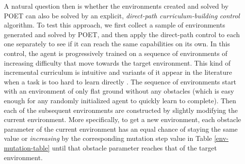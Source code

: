 \documentclass{article}
\newcommand{\jc}[1]{\comments{\textcolor{deepForestGreen}{[JC: #1]}}}
\newcommand{\jl}[1]{\comments{\textcolor{magenta}{[Joel: #1]}}}
\newcommand{\ks}[1]{\comments{\textcolor{purple}{[Ken: #1]}}}
\newcommand{\rw}[1]{\comments{\textcolor{blue}{[Rui: #1]}}}
\newcommand{\comments}[1]{#1}
\begin{document}
A natural question then is whether the environments created and solved by POET can also be solved by an explicit, \emph{direct-path curriculum-building control} algorithm.  To test this approach, we first collect a sample of environments generated and solved by POET, and then apply the direct-path control to each one separately to see if it can reach the same capabilities on its own. 
In this control, the agent is progressively trained on a sequence of environments of increasing difficulty that move towards the target environment. 
This kind of incremental curriculum is intuitive and variants of it appear in the literature when a task is too hard to learn directly \cite{gomez:ab97, bengio2009curriculum, karpathy2012curriculum,heess2017emergence, justesen2017procedural}.
The sequence of environments start with an environment of only flat ground without any obstacles (which is easy enough for any randomly initialized agent to quickly learn to complete). Then each of the subsequent environments are constructed by slightly modifying the current environment. More specifically, to get a new environment, each obstacle parameter of the current environment has an equal chance of staying the same value or \emph{increasing} by the corresponding mutation step value in Table \ref{env-mutation-table} until that obstacle parameter reaches that of the target environment. 
\end{document}
